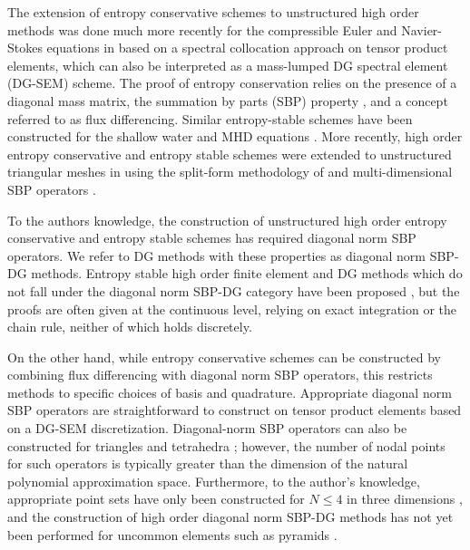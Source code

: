 \documentclass[preprint,10pt]{elsarticle}
\theoremstyle{definition}
\theoremstyle{lemma}
\theoremstyle{theorem}
\theoremstyle{assumption}
\begin{document}
The extension of entropy conservative schemes to unstructured high order methods was done much more recently for the compressible Euler and Navier-Stokes equations in \cite{fisher2013high, carpenter2014entropy} based on a spectral collocation approach on tensor product elements, which can also be interpreted as a mass-lumped DG spectral element (DG-SEM) scheme.  The proof of entropy conservation relies on the presence of a diagonal mass matrix, the summation by parts (SBP) property \cite{gassner2013skew}, and  a concept referred to as flux differencing.  Similar entropy-stable schemes have been constructed for the shallow water and MHD equations \cite{gassner2016well,  wintermeyer2017entropy, winters2017uniquely}.  More recently, high order entropy conservative and entropy stable schemes were extended to unstructured triangular meshes in \cite{chen2017entropy} using the split-form methodology of \cite{gassner2016split} and multi-dimensional SBP operators \cite{hicken2016multidimensional, crean2017high}.  

To the authors knowledge, the construction of unstructured high order entropy conservative and entropy stable schemes  has required diagonal norm SBP operators.  We refer to DG methods with these properties as diagonal norm SBP-DG methods.  Entropy stable high order finite element and DG methods which do not fall under the diagonal norm SBP-DG category have been proposed \cite{hughes1986new}, but the proofs are often given at the continuous level, relying on exact integration or the chain rule, neither of which holds discretely.

On the other hand, while entropy conservative schemes can be constructed by combining flux differencing with diagonal norm SBP operators, this restricts methods to specific choices of basis and quadrature.  Appropriate diagonal norm SBP operators are straightforward to construct on tensor product elements based on a DG-SEM discretization.  Diagonal-norm SBP operators can also be constructed for triangles and tetrahedra \cite{chin1999higher,  hicken2016multidimensional, chen2017entropy}; however, the number of nodal points for such operators is typically greater than the dimension of the natural polynomial approximation space.  Furthermore, to the author's knowledge, appropriate point sets have only been constructed for $N \leq 4$ in three dimensions \cite{zhebel2014comparison}, and the construction of high order diagonal norm SBP-DG methods has not yet been performed for uncommon elements such as pyramids \cite{chan2016orthogonal}.  
\end{document}
